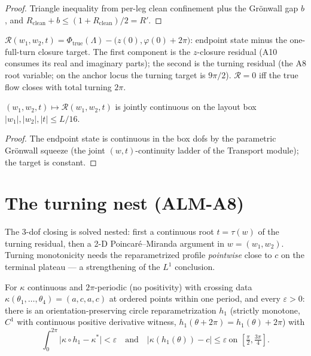 \begin{proof}
  \leanok
  Triangle inequality from per-leg clean confinement plus the Grönwall gap
  $b$, and $R_{\mathrm{clean}}+b\le(1+R_{\mathrm{clean}})/2=R'$.
\end{proof}

\begin{definition}
  \label{def:layout_residual}
  $\mathcal R(w_1,w_2,t)
    =\Phi_{\mathrm{true}}(\Lambda)-\bigl(z(0),\varphi(0)+2\pi\bigr)$:
  endpoint state minus the one-full-turn closure target.  The first component
  is the $z$-closure residual (A10 consumes its real and imaginary parts);
  the second is the turning residual (the A8 root variable; on the anchor
  locus the turning target is $9\pi/2$).  $\mathcal R=0$ iff the true flow
  closes with total turning $2\pi$.
\end{definition}

\begin{lemma}
  \label{lem:layout_residual_continuous}
  $(w_1,w_2,t)\mapsto\mathcal R(w_1,w_2,t)$ is jointly continuous on the
  layout box $|w_1|,|w_2|,|t|\le L/16$.
\end{lemma}

\begin{proof}
  \leanok
  The endpoint state is continuous in the box dofs by the parametric
  Grönwall squeeze (the joint $(w,t)$-continuity ladder of the Transport
  module); the target is constant.
\end{proof}

\section{The turning nest (ALM-A8)}

The 3-dof closing is solved nested: first a continuous root $t=\tau(w)$ of
the turning residual, then a 2-D Poincaré--Miranda argument in
$w=(w_1,w_2)$.  Turning monotonicity needs the reparametrized profile
\emph{pointwise} close to $c$ on the terminal plateau — a strengthening of
the $L^1$ conclusion.

\begin{lemma}
  \label{lem:bicircle_L1_reparam_pointwise}
  For $\kappa$ continuous and $2\pi$-periodic (no positivity) with crossing
  data $\kappa(\theta_1,\ldots,\theta_4)=(a,c,a,c)$ at ordered points within
  one period, and every $\varepsilon>0$: there is an orientation-preserving
  circle reparametrization $h_1$ (strictly monotone, $C^1$ with continuous
  positive derivative witness, $h_1(\theta+2\pi)=h_1(\theta)+2\pi$) with
  \[
    \int_0^{2\pi}\bigl|\kappa\circ h_1-\kappa^*\bigr|<\varepsilon
    \quad\text{and}\quad
    \bigl|\kappa(h_1(\theta))-c\bigr|\le\varepsilon
    \ \text{on }[\tfrac\pi2,\tfrac{3\pi}4].
  \]
\end{lemma}

